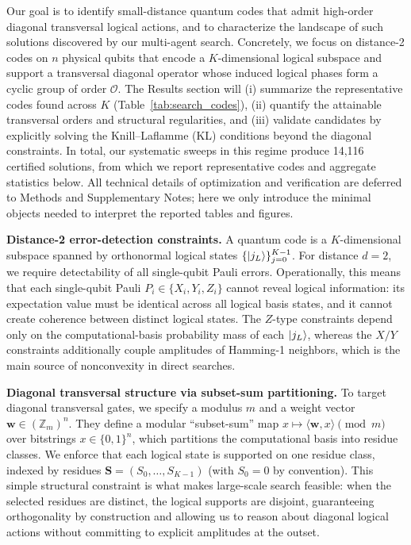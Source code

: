 \documentclass[pdflatex,sn-nature]{sn-jnl}%
\theoremstyle{thmstyleone}%
\theoremstyle{thmstyletwo}%
\theoremstyle{thmstylethree}%
\begin{document}
Our goal is to identify small-distance quantum codes that admit high-order diagonal transversal logical actions, and to characterize the landscape of such solutions discovered by our multi-agent search.
Concretely, we focus on distance-2 codes on $n$ physical qubits that encode a $K$-dimensional logical subspace and support a transversal diagonal operator whose induced logical phases form a cyclic group of order $\mathcal{O}$.
The Results section will (i) summarize the representative codes found across $K$ (Table~\ref{tab:search_codes}), (ii) quantify the attainable transversal orders and structural regularities, and (iii) validate candidates by explicitly solving the Knill--Laflamme (KL) conditions beyond the diagonal constraints. In total, our systematic sweeps in this regime produce 14,116 certified solutions, from which we report representative codes and aggregate statistics below. All technical details of optimization and verification are deferred to Methods and Supplementary Notes; here we only introduce the minimal objects needed to interpret the reported tables and figures.

\textbf{Distance-2 error-detection constraints.}
A quantum code is a $K$-dimensional subspace spanned by orthonormal logical states $\{\ket{j_L}\}_{j=0}^{K-1}$.
For distance $d=2$, we require detectability of all single-qubit Pauli errors.
Operationally, this means that each single-qubit Pauli $P_i\in\{X_i,Y_i,Z_i\}$ cannot reveal logical information: its expectation value must be identical across all logical basis states, and it cannot create coherence between distinct logical states.
The $Z$-type constraints depend only on the computational-basis probability mass of each $\ket{j_L}$, whereas the $X/Y$ constraints additionally couple amplitudes of Hamming-1 neighbors, which is the main source of nonconvexity in direct searches.

\textbf{Diagonal transversal structure via subset-sum partitioning.}
To target diagonal transversal gates, we specify a modulus $m$ and a weight vector $\mathbf w\in(\mathbb{Z}_m)^n$.
They define a modular ``subset-sum'' map $x\mapsto \langle \mathbf w,x\rangle\!\!\pmod m$ over bitstrings $x\in\{0,1\}^n$, which partitions the computational basis into residue classes.
We enforce that each logical state is supported on one residue class, indexed by residues $\mathbf S=(S_0,\dots,S_{K-1})$ (with $S_0=0$ by convention).
This simple structural constraint is what makes large-scale search feasible: when the selected residues are distinct, the logical supports are disjoint, guaranteeing orthogonality by construction and allowing us to reason about diagonal logical actions without committing to explicit amplitudes at the outset.
\end{document}
